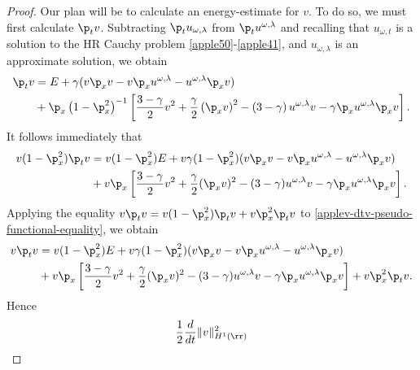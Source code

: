       \begin{proof} Our plan will be to calculate an energy-estimate for $v$.
			To do so, we must first calculate $\p_t v$. Subtracting $\p_t
			u_{\omega, \lambda}$ from $\p_t u^{\omega,\lambda}$ and
			recalling that $u_{\omega,t}$ is a solution to the HR Cauchy
			problem \eqref{apple50}-\eqref{apple41},
			and $u_{\omega,\lambda}$ is an approximate solution, we obtain
			\begin{equation*}
				\begin{split}
					\p_t v 
					& = E + \gamma(v \p_x v - v \p_x u^{\omega,\lambda} - u^{\omega,\lambda} \p_x v) 
					\\
					& + \p_x \left( 1 - \p_x^2 \right)^{-1}  \left[ \frac{3-
					\gamma}{2}v^2 + \frac{\gamma}{2}\left( \p_x v \right)^2 - \left(
					3 - \gamma \right)u^{\omega,\lambda} v -
					\gamma \p_x u^{\omega,\lambda} \p_x v \right].
				\end{split}
			\end{equation*}
			It follows immediately that
		\begin{equation}
			\label{applev-dtv-pseudo-functional-equality}
			\begin{split}
			v(1-\p_x^2)\p_t v &= v(1- \p_x^2)E + v\gamma(1- \p_x^2)(v\p_x v 
			- v\p_x u^{\omega,\lambda} -
			u^{\omega,\lambda} \p_x v)
			\\
			&+ v\p_x \left[ \frac{3-\gamma}{2}v^2 + \frac{\gamma}{2}(\p_x v)^2 -
			(3-\gamma)u^{\omega,\lambda} v - \gamma \p_x u^{\omega,\lambda} \p_x v \right].
		\end{split}
	\end{equation}
	Applying the equality $v\p_t v = v(1-\p_x^2) \p_t v + v\p_x^2 \p_t v$ to
	\eqref{applev-dtv-pseudo-functional-equality}, we obtain
	\begin{equation*}
		\begin{split}
		v \p_t v &= v(1- \p_x^2)E + v\gamma(1- \p_x^2)(v\p_x v - v\p_x u^{\omega,\lambda} -
			u^{\omega,\lambda} \p_x v)
			\\
			&+ v\p_x \left[ \frac{3-\gamma}{2}v^2 + \frac{\gamma}{2}(\p_x v)^2 -
			(3-\gamma)u^{\omega,\lambda} v - \gamma \p_x u^{\omega,\lambda} \p_x v
			\right] + v\p_x^2 \p_t v.
		\end{split}
	\end{equation*}
	Hence
	\begin{equation}
		\label{appleenergy-est}
		\begin{split}
			&\frac{1}{2} \frac{d}{dt} \|v\|_{H^1(\rr)}^2  
			\\

\end{split}
\end{equation}
\end{proof}
